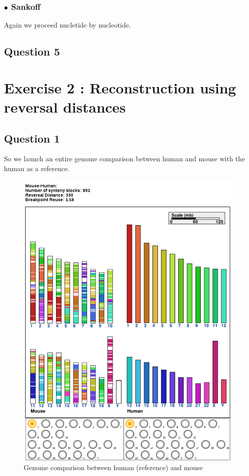 \documentclass[]{article}
\begin{document}
\subsubsection*{$\bullet$ Sankoff }
Again we proceed nucletide by nucleotide.
\subsection{Question 5}



\section{Exercise 2 : Reconstruction using reversal distances}
\subsection{Question 1}
So we launch an entire genome comparison between human and mouse with the human as a reference.

\begin{figure}[H]
	\includegraphics*[width = \linewidth]{../human_mouse.png}
	\caption{ Genome comparison between human (reference) and mouse }
\end{figure}
\end{document}
